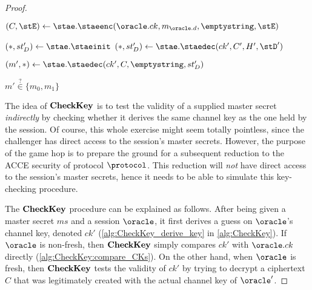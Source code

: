 \begin{proof}
\begin{algorithm}
\begin{algorithmic}[1]
		\State {}

		\State $(C, \stE) \gets \stae.\staeenc(\oracle.ck, m_{\oracle.d}, \emptystring, \stE)$
		\hspace{1em}   \label{alg:CheckKey:encrypt_mb}
		
			
		

		
		

		\State

		\State {}
		\State $(*, st'_D) \gets \stae.\staeinit$ \label{alg:CheckKey:recreate_state:init}
			\State $(*, st'_D) \gets \stae.\staedec(ck',C',H', \stD')$\label{alg:CheckKey:recreate_state:decrypt}
		\EndFor
 
		\State
		\State {}
		\State\label{alg:CheckKey_line_decrypt} $(m',*) \gets \stae.\staedec(ck', C, \emptystring, st'_D)$

		\State
		\State \Return $m' \overset{?}{\in} \lbrace m_0, m_1 \rbrace$
	
	\EndIf
\end{algorithmic}


\end{algorithm}


The idea of $\mathbf{CheckKey}$ is to test the validity of a supplied master secret \emph{indirectly} by checking whether it derives the same channel key as the one held by the session.
Of course,
this whole exercise might seem totally pointless,
since the challenger has direct access to the session's master secrets.
However,
the purpose of the game hop is to prepare the ground for a subsequent reduction to the ACCE security of protocol $\protocol$.
This reduction will \emph{not} have direct access to the session's master secrets,
hence it needs to be able to simulate this key-checking procedure.

The $\mathbf{CheckKey}$ procedure can be explained as follows.
After being given a master secret $ms$ and a session $\oracle$,
it first derives a guess on $\oracle$'s channel key,
denoted $ck'$ (\cref{alg:CheckKey_derive_key} in \cref{alg:CheckKey}).
If $\oracle$ is non-fresh,
then $\mathbf{CheckKey}$ simply compares $ck'$ with $\oracle.ck$ directly (\cref{alg:CheckKey:compare_CKs}).
On the other hand,
when $\oracle$ is fresh,
then $\mathbf{CheckKey}$ tests the validity of $ck'$ by trying to decrypt a ciphertext $C$ that was legitimately created with the actual channel key of $\oracle'$.


\end{proof}
